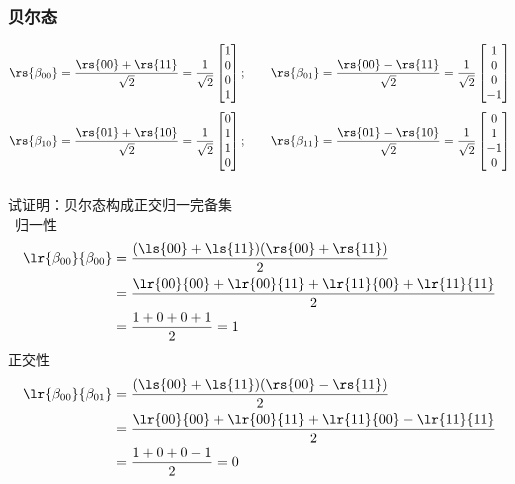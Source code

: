 \begin{frame} 
    \frametitle{贝尔态}
    \[\rs{\beta_{00}}=\frac{\rs{00}+\rs{11}}{\sqrt{2}} =\frac{1}{\sqrt{2}} \begin{bmatrix}
        1 \\
        0 \\
        0 \\
        1
     \end{bmatrix} ; \qquad \rs{\beta_{01}}=\frac{\rs{00}-\rs{11}}{\sqrt{2}} = \frac{1}{\sqrt{2}} \begin{bmatrix}
        1 \\
        0 \\
        0 \\
        -1
     \end{bmatrix} \]
    \[\rs{\beta_{10}}=\frac{\rs{01}+\rs{10}}{\sqrt{2}} =\frac{1}{\sqrt{2}} \begin{bmatrix}
        0 \\
        1 \\
        1 \\
        0
     \end{bmatrix} ; \qquad \rs{\beta_{11}}=\frac{\rs{01}-\rs{10}}{\sqrt{2}} =\frac{1}{\sqrt{2}} \begin{bmatrix}
        0 \\
        1 \\
        -1 \\
        0
     \end{bmatrix} \]
\end{frame}


\begin{frame}
    \frametitle{}
    {\Bullet}试证明：贝尔态构成正交归一完备集\\ \vspace{1.0em}
    \证~归一性 \[\begin{aligned}
        \lr{\beta_{00}}{\beta_{00}} &= \frac{(\ls{00}+\ls{11})(\rs{00}+\rs{11})}{2} \\
        &= \frac{\lr{00}{00}+\lr{00}{11}+\lr{11}{00}+\lr{11}{11}}{2} \\
        &= \frac{1+0+0+1}{2} = 1 
    \end{aligned}\]
    正交性 \[\begin{aligned}
        \lr{\beta_{00}}{\beta_{01}} &= \frac{(\ls{00}+\ls{11})(\rs{00}-\rs{11})}{2} \\
        &= \frac{\lr{00}{00}+\lr{00}{11}+\lr{11}{00}-\lr{11}{11}}{2} \\
        &= \frac{1+0+0-1}{2} = 0 
    \end{aligned}\]
\end{frame}

